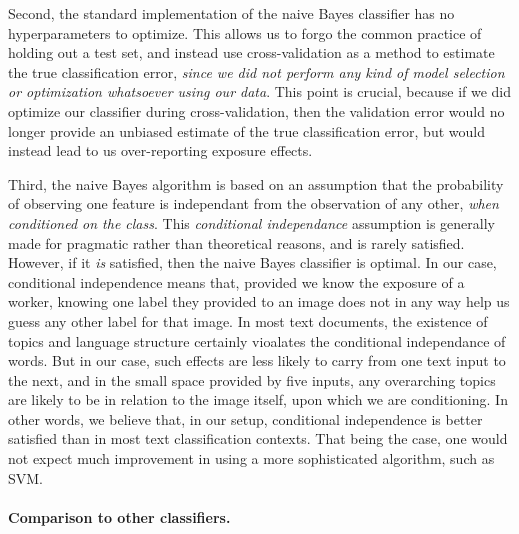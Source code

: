 \documentclass[12pt]{article}
\begin{document}
Second, the standard implementation of the naive Bayes classifier has no 
hyperparameters to optimize.  This allows us to forgo the common practice 
of holding out a test set, and instead use cross-validation as a method to
estimate the true classification error, \textit{since we did not perform
any kind of model selection or optimization whatsoever using our data}.
This point is crucial, because if we did optimize our classifier during 
cross-validation, then the validation error would no longer provide an 
unbiased estimate of the true classification error, but would instead lead
to us over-reporting exposure effects.

Third, the naive Bayes algorithm is based on an assumption that the 
probability of observing one feature is independant from the observation
of any other, \textit{when conditioned on the class}.  This
\textit{conditional independance} assumption is generally made for
pragmatic rather than theoretical reasons, and is rarely satisfied.  However,
if it \textit{is} satisfied, then the naive Bayes classifier is optimal.
In our case, conditional independence means that, provided we know the 
exposure of a worker, knowing one label they provided to an image does
not in any way help us guess any other label for that image.  In most
text documents, the existence of topics and language structure certainly
vioalates the conditional independance of words.  But in our case, such 
effects are less likely to carry from one text input to the next, and in the
small space provided by five inputs, any overarching topics are likely to
be in relation to the image itself, upon which we are conditioning.  In other
words, we believe that, in our setup, conditional independence is better 
satisfied than in most text classification contexts.  That being the case,
one would not expect much improvement in using a more sophisticated algorithm,
such as SVM.

\paragraph{Comparison to other classifiers.} 
\end{document}
